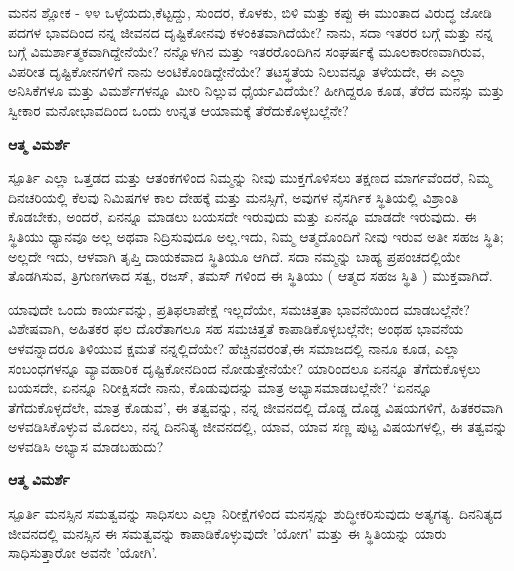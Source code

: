 \begin{mananam}{\mananamfont ಮನನ ಶ್ಲೋಕ - ೪೪}
\small \mananatext ಒಳ್ಳೆಯದು,ಕೆಟ್ಟದ್ದು, ಸುಂದರ, ಕೊಳಕು, ಬಿಳಿ ಮತ್ತು ಕಪ್ಪು ಈ ಮುಂತಾದ ವಿರುದ್ಧ ಜೋಡಿ ಪದಗಳ ಭಾವದಿಂದ ನನ್ನ ಜೀವನದ ದೃಷ್ಟಿಕೋನವು ಕಳಂಕಿತವಾಗಿದೆಯೇ? ನಾನು, ಸದಾ ಇತರರ ಬಗ್ಗೆ ಮತ್ತು ನನ್ನ ಬಗ್ಗೆ ವಿಮರ್ಶಾತ್ಮಕವಾಗಿದ್ದೇನೆಯೇ? ನನ್ನೊಳಗಿನ ಮತ್ತು ಇತರರೊಂದಿಗಿನ  ಸಂಘರ್ಷಕ್ಕೆ ಮೂಲಕಾರಣವಾಗಿರುವ, ವಿಪರೀತ ದೃಷ್ಟಿಕೋನಗಳಿಗೆ ನಾನು ಅಂಟಿಕೊಂಡಿದ್ದೇನೆಯೇ? ತಟಸ್ಥತೆಯ ನಿಲುವನ್ನೂ ತಳೆಯದೇ, ಈ ಎಲ್ಲಾ ಅನಿಸಿಕೆಗಳೂ ಮತ್ತು ವಿಮರ್ಶೆಗಳನ್ನೂ ಮೀರಿ ನಿಲ್ಲುವ ಧೈರ್ಯವಿದೆಯೇ? ಹೀಗಿದ್ದರೂ ಕೂಡ,  ತೆರೆದ ಮನಸ್ಸು ಮತ್ತು ಸ್ವೀಕಾರ ಮನೋಭಾವದಿಂದ ಒಂದು ಉನ್ನತ ಆಯಾಮಕ್ಕೆ ತೆರೆದುಕೊಳ್ಳಬಲ್ಲೆನೇ?
\end{mananam}
\WritingHand\enspace\textbf{ಆತ್ಮ ವಿಮರ್ಶೆ}
\begin{inspiration}{\mananamfont ಸ್ಪೂರ್ತಿ}
\small \mananatext ಎಲ್ಲಾ ಒತ್ತಡದ ಮತ್ತು ಆತಂಕಗಳಿಂದ ನಿಮ್ಮನ್ನು ನೀವು ಮುಕ್ತಗೊಳಿಸಲು ತಕ್ಷಣದ ಮಾರ್ಗವೆಂದರೆ, ನಿಮ್ಮ ದಿನಚರಿಯಲ್ಲಿ ಕೆಲವು ನಿಮಿಷಗಳ ಕಾಲ ದೇಹಕ್ಕೆ ಮತ್ತು ಮನಸ್ಸಿಗೆ, ಅವುಗಳ ನೈಸರ್ಗಿಕ ಸ್ಥಿತಿಯಲ್ಲಿ ವಿಶ್ರಾಂತಿ ಕೊಡಬೇಕು,  ಅಂದರೆ,  ಏನನ್ನೂ ಮಾಡಲು ಬಯಸದೇ ಇರುವುದು ಮತ್ತು ಏನನ್ನೂ ಮಾಡದೇ ಇರುವುದು. ಈ ಸ್ಥಿತಿಯು ಧ್ಯಾನವೂ ಅಲ್ಲ ಅಥವಾ ನಿದ್ರಿಸುವುದೂ ಅಲ್ಲ.ಇದು, ನಿಮ್ಮ ಆತ್ಮದೊಂದಿಗೆ ನೀವು ಇರುವ ಅತೀ ಸಹಜ ಸ್ಥಿತಿ;   ಅಲ್ಲದೇ ಇದು, ಆಳವಾಗಿ ತೃಪ್ತಿ ದಾಯಕವಾದ ಸ್ಥಿತಿಯೂ ಆಗಿದೆ. ಸದಾ ನಮ್ಮನ್ನು ಬಾಹ್ಯ ಪ್ರಪಂಚದಲ್ಲಿಯೇ ತೊಡಗಿಸುವ, ತ್ರಿಗುಣಗಳಾದ ಸತ್ವ, ರಜಸ್, ತಮಸ್ ಗಳಿಂದ ಈ ಸ್ಥಿತಿಯು ( ಆತ್ಮದ ಸಹಜ ಸ್ಥಿತಿ ) ಮುಕ್ತವಾಗಿದೆ. 
\end{inspiration}
\newpage

\newpage
\begin{mananam}{}
\small \mananatext ಯಾವುದೇ ಒಂದು ಕಾರ್ಯವನ್ನು, ಪ್ರತಿಫಲಾಪೇಕ್ಷೆ ಇಲ್ಲದೆಯೇ, ಸಮಚಿತ್ತತಾ ಭಾವನೆಯಿಂದ  ಮಾಡಬಲ್ಲೆನೇ? ವಿಶೇಷವಾಗಿ,  ಅಹಿತಕರ ಫಲ ದೊರೆತಾಗಲೂ ಸಹ ಸಮಚಿತ್ತತೆ ಕಾಪಾಡಿಕೊಳ್ಳಬಲ್ಲೆನೇ; ಅಂಥಹ ಭಾವನೆಯ ಆಳವನ್ನಾದರೂ ತಿಳಿಯುವ ಕ್ಷಮತೆ ನನ್ನಲ್ಲಿದೆಯೇ? ಹೆಚ್ಚಿನವರಂತೆ,ಈ ಸಮಾಜದಲ್ಲಿ ನಾನೂ ಕೂಡ, ಎಲ್ಲಾ ಸಂಬಂಧಗಳನ್ನೂ ವ್ಯಾವಹಾರಿಕ ದೃಷ್ಟಿಕೋನದಿಂದ ನೋಡುತ್ತೇನೆಯೇ? ಯಾರಿಂದಲೂ ಏನನ್ನೂ ತೆಗೆದುಕೊಳ್ಳಲು ಬಯಸದೇ, ಏನನ್ನೂ ನಿರೀಕ್ಷಿಸದೇ ನಾನು,  ಕೊಡುವುದನ್ನು ಮಾತ್ರ ಅಭ್ಯಾಸಮಾಡಬಲ್ಲೆನೇ? ‘ಏನನ್ನೂ ತೆಗೆದುಕೊಳ್ಳದೆಲೇ, ಮಾತ್ರ ಕೊಡುವ’, ಈ ತತ್ವವನ್ನು, ನನ್ನ ಜೀವನದಲ್ಲಿ ದೊಡ್ಡ ದೊಡ್ಡ ವಿಷಯಗಳಿಗೆ, ಹಿತಕರವಾಗಿ ಅಳವಡಿಸಿಕೊಳ್ಳುವ  ಮೊದಲು, ನನ್ನ ದಿನನಿತ್ಯ ಜೀವನದಲ್ಲಿ, ಯಾವ, ಯಾವ ಸಣ್ಣ ಪುಟ್ಟ ವಿಷಯಗಳಲ್ಲಿ, ಈ ತತ್ವವನ್ನು ಅಳವಡಿಸಿ ಅಭ್ಯಾಸ ಮಾಡಬಹುದು? 
\end{mananam}
\WritingHand\enspace\textbf{ಆತ್ಮ ವಿಮರ್ಶೆ}
\begin{inspiration}{\mananamfont ಸ್ಪೂರ್ತಿ}
\small \mananatext ಮನಸ್ಸಿನ ಸಮತ್ವವನ್ನು ಸಾಧಿಸಲು ಎಲ್ಲಾ ನಿರೀಕ್ಷೆಗಳಿಂದ ಮನಸ್ಸನ್ನು ಶುದ್ಧೀಕರಿಸುವುದು ಅತ್ಯಗತ್ಯ. ದಿನನಿತ್ಯದ ಜೀವನದಲ್ಲಿ ಮನಸ್ಸಿನ ಈ ಸಮತ್ವವನ್ನು ಕಾಪಾಡಿಕೊಳ್ಳುವುದೇ 'ಯೋಗ' ಮತ್ತು ಈ ಸ್ಥಿತಿಯನ್ನು ಯಾರು ಸಾಧಿಸುತ್ತಾರೋ ಅವನೇ 'ಯೋಗಿ'.
\end{inspiration}
\newpage

